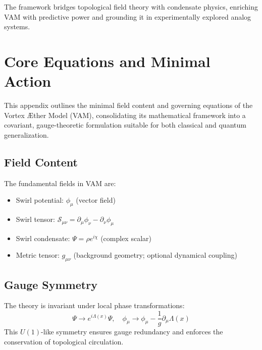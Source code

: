         The framework bridges topological field theory with condensate physics, enriching VAM with predictive power and grounding it in experimentally explored analog systems.

\section{Core Equations and Minimal Action}
        This appendix outlines the minimal field content and governing equations of the Vortex Æther Model (VAM), consolidating its mathematical framework into a covariant, gauge-theoretic formulation suitable for both classical and quantum generalization.

        \subsection{Field Content}
        The fundamental fields in VAM are:
        \begin{itemize}
            \item Swirl potential: $\phi_\mu$ (vector field)
            \item Swirl tensor: $\mathcal{S}_{\mu\nu} = \partial_\mu \phi_\nu - \partial_\nu \phi_\mu$
            \item Swirl condensate: $\Psi = \rho e^{i\chi}$ (complex scalar)
            \item Metric tensor: $g_{\mu\nu}$ (background geometry; optional dynamical coupling)
        \end{itemize}

        \subsection{Gauge Symmetry}
        The theory is invariant under local phase transformations:
        \begin{equation}
            \Psi \rightarrow e^{i\Lambda(x)} \Psi, \quad \phi_\mu \rightarrow \phi_\mu - \frac{1}{g} \partial_\mu \Lambda(x)
        \end{equation}
        This $U(1)$-like symmetry ensures gauge redundancy and enforces the conservation of topological circulation.

